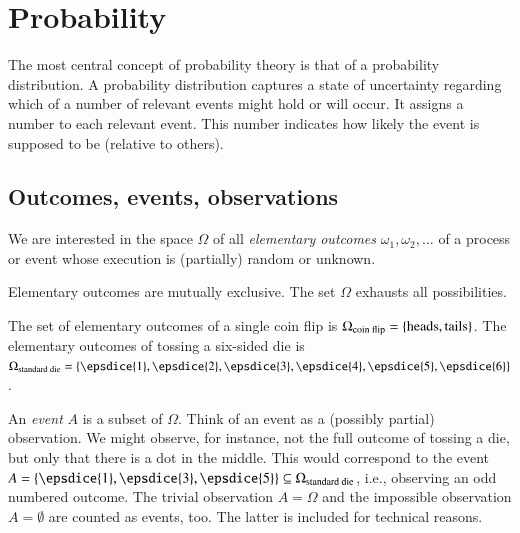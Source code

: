 \documentclass[nobib,nofonts]{tufte-handout}
\renewcommand{\markdef}[1]{\emph{#1}}
\begin{document}
\section{Probability}

The most central concept of probability theory is that of a probability distribution.
A probability distribution captures a state of uncertainty regarding which of a number of relevant events might hold or will occur.
It assigns a number to each relevant event.
This number indicates how likely the event is supposed to be (relative to others).

\subsection{Outcomes, events, observations}

We are interested in the space $\Omega$ of all \markdef{elementary outcomes} $\omega_1, \omega_2, \dots$ of a process or event whose execution is (partially) random or unknown.

Elementary outcomes are mutually exclusive.
The set $\Omega$ exhausts all possibilities.

\begin{example}
  The set of elementary outcomes of a single coin flip is $\Omega_{\text{coin flip}} =
  \left\{\text{heads}, \text{tails}\right\}$. The elementary outcomes of tossing a six-sided die is
  $\Omega_{\text{standard die}} = \set{\epsdice{1}, \epsdice{2}, \epsdice{3}, \epsdice{4},
    \epsdice{5}, \epsdice{6}}$.
\end{example}

An \markdef{event} $A$ is a subset of $\Omega$. Think of an event as a (possibly partial)
observation. We might observe, for instance, not the full outcome of tossing a die, but only
that there is a dot in the middle. This would correspond to the event
$A = \set{\epsdice{1}, \epsdice{3}, \epsdice{5}} \subseteq \Omega_{\text{standard die}}$,
i.e., observing an odd numbered outcome. The trivial observation $A = \Omega$ and the
impossible observation $A = \emptyset$ are counted as events, too. The latter is included for
technical reasons.
\end{document}
